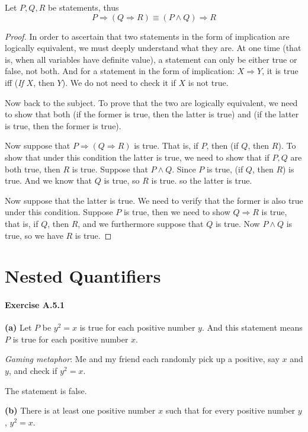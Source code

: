 \begin{prop}
Let $P,Q,R$ be statements, thus
\[
P \Longrightarrow (Q \Longrightarrow R) \equiv (P \wedge Q) \Longrightarrow R
\]
\end{prop}
\begin{proof}
In order to ascertain that two statements in the form of implication are logically equivalent, we must 
deeply understand what they are. At one time (that is, when all variables have definite value), a 
statement can only be either true or false, not both. And for a statement in the form of implication: 
$X \Longrightarrow Y$, it is true iff (\emph{If} $X$, then $Y$). We do not need to check it if $X$ is 
not true.

Now back to the subject. To prove that the two are logically equivalent, we need to show that both 
(if the former is true, then the latter is true) and (if the latter is true, then the former is true).

Now suppose that $P \Longrightarrow (Q \Longrightarrow R)$ is true. That is, if $P$, then 
(if $Q$, then $R$). To show that under this condition the latter is true, we need to show that if $P,Q$ 
are both true, then $R$ is true. Suppose that $P \wedge Q$. Since $P$ is true, (if $Q$, then $R$) is 
true. And we know that $Q$ is true, so $R$ is true. so the latter is true.

Now suppose that the latter is true. We need to verify that the former is also true under this 
condition. Suppose $P$ is true, then we need to show $Q \Longrightarrow R$ is true, that is, if $Q$, 
then $R$, and we furthermore suppose that $Q$ is true. Now $P \wedge Q$ is true, so we have $R$ is true.
\end{proof}

\section{Nested Quantifiers}
\paragraph{Exercise A.5.1} \label{exercisea.5.1}
\textbf{(a)} Let $P$ be $y^2=x$ is true for each positive number $y$. And this statement means $P$ is 
true for each positive number $x$. 

\emph{Gaming metaphor}: Me and my friend each randomly pick up a positive, say $x$ and $y$, and check 
if $y^2=x$.

The statement is false.

\textbf{(b)} There is at least one positive number $x$ such that for every positive number $y$, 
$y^2=x$.

